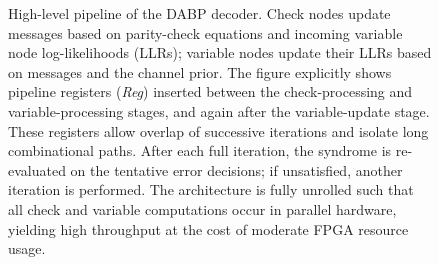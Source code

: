 \documentclass[conference]{IEEEtran}  %
\begin{document}
\begin{figure}[t]
    \centering
    \caption{High-level pipeline of the DABP decoder.  Check nodes update messages based on parity-check equations and incoming variable node log-likelihoods (LLRs); variable nodes update their LLRs based on messages and the channel prior.  The figure explicitly shows pipeline registers (\emph{Reg}) inserted between the check-processing and variable-processing stages, and again after the variable-update stage.  These registers allow overlap of successive iterations and isolate long combinational paths.  After each full iteration, the syndrome is re-evaluated on the tentative error decisions; if unsatisfied, another iteration is performed.  The architecture is fully unrolled such that all check and variable computations occur in parallel hardware, yielding high throughput at the cost of moderate FPGA resource usage.}
    \label{fig:fpga}
\end{figure}
\end{document}
